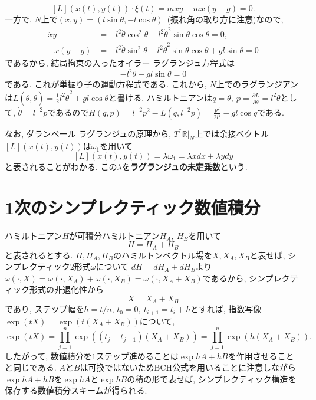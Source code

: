 \documentclass[a4paper]{ujarticle}
\numberwithin{equation}{section}
\theoremstyle{definition}
\begin{document}
    \[
        [L](x(t), y(t)) \cdot \xi(t) = m\ddot{x} y - m x (\ddot{y} - g) = 0.
    \]
    一方で, $N$上で$(x, y) = (l \sin{\theta}, - l \cos{\theta})$\ (振れ角の取り方に注意)なので,
    \begin{align}
        \ddot{x}y &= - l^2 \ddot{\theta} \cos^2{\theta} + l^2 \dot{\theta}^2 \sin{\theta} \cos{\theta} = 0, \\
        - x (\ddot{y} - g) &= - l^2 \ddot{\theta} \sin^2{\theta} - l^2 \dot{\theta}^2 \sin{\theta} \cos{\theta} + gl \sin{\theta}  = 0
    \end{align}
    であるから, 結局拘束の入ったオイラー-ラグランジュ方程式は
    \[
        - l^2 \ddot{\theta} + gl \sin{\theta} = 0
    \]
    である. これが単振り子の運動方程式である.
    これから, $N$上でのラグランジアンは$\displaystyle L(\theta, \dot{\theta}) = \frac{1}{2} l^2 \dot{\theta}^2 + gl \cos{\theta}$と書ける.
    ハミルトニアンは$\displaystyle q = \theta, \  p = \frac{\partial L}{\partial \dot{\theta}} = l^2 \dot{\theta}$として, 
    $\dot{\theta} = l^{-2} p$であるので$\displaystyle H(q, p) = l^{-2} p^2 - L(q, l^{-2}p) = \frac{p^2}{2 l^2} - gl \cos{q}$である.

    なお, ダランベール-ラグランジュの原理から, $T^{*}\mathbb{R}|_{N}$上では余接ベクトル$[L](x(t), y(t))$は$\omega_1$を用いて
    \[
        [L](x(t), y(t)) = \lambda \omega_1 = \lambda x dx + \lambda y dy
    \]
    と表されることがわかる. この$\lambda$を\textbf{ラグランジュの未定乗数}という.
    
    \section{1次のシンプレクティック数値積分}

    ハミルトニアン$H$が可積分ハミルトニアン$H_A, \ H_B$を用いて
    \[
        H = H_{A} + H_{B}
    \]
    と表されるとする. $H, H_{A}, H_B$のハミルトンベクトル場を$X, X_{A}, X_B$と表せば, シンプレクティック$2$形式$\omega$について
    $dH = dH_{A} + d H_B$より$\omega(\cdot, X) = \omega(\cdot, X_A) + \omega(\cdot, X_B) = \omega(\cdot, X_A + X_B)$であるから,
    シンプレクティック形式の非退化性から
    \[
        X = X_{A} + X_B
    \] 
    であり, ステップ幅を$h = t/n$, $t_{0} = 0, \ t_{i+1} = t_{i} + h$とすれば, 指数写像$\exp(tX) = \exp(t(X_A + X_B))$について,
    \[
        \exp(tX) = \prod_{j = 1}^{n} \exp((t_{j} - t_{j-1})(X_A + X_B)) = \prod_{j = 1}^{n} \exp(h(X_A + X_B)).
    \]
    したがって, 数値積分を$1$ステップ進めることは$\exp{hA + h B}$を作用させることと同じである.
    $A$と$B$は可換ではないためBCH公式を用いることに注意しながら$\exp{hA + h B}$を$\exp{hA}$と$\exp{h B}$の積の形で表せば, 
    シンプレクティック構造を保存する数値積分スキームが得られる.
\end{document}
